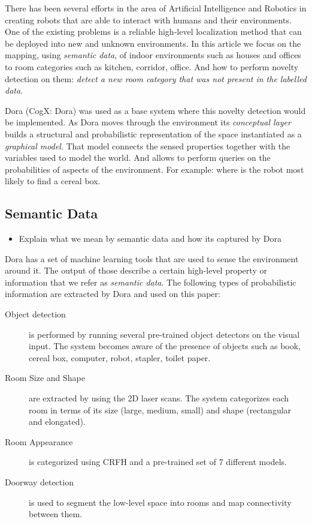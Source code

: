 \documentclass[runningheads,a4paper]{llncs}
\begin{document}
There has been several efforts in the area of Artificial Intelligence and Robotics in creating robots
that are able to interact with humans and their environments.
One of the existing problems is a reliable high-level localization method that can be deployed into new
and unknown environments.
In this article we focus on the mapping, using \emph{semantic data}, of indoor environments such as houses and offices to room categories
such as kitchen, corridor, office.
And how to perform novelty detection on them: \emph{detect a new room category that was not present in the labelled data}.

Dora\cite{dora} (CogX: Dora) was used as a base system where this novelty detection would be implemented.
As Dora moves through the environment its \emph{conceptual layer} builds a structural and probabilistic representation of the space
instantiated as a \emph{graphical model}.
That model connects the sensed properties together with the variables used to model the world.
And allows to perform queries on the probabilities of aspects of the environment.
For example: where is the robot most likely to find a cereal box\cite{exploiting}.

\subsection{Semantic Data}
\begin{itemize}
\item Explain what we mean by semantic data and how its captured by Dora
\end{itemize}

Dora has a set of machine learning tools that are used to sense the environment around it.
The output of those describe a certain high-level property or information that we refer as \emph{semantic data}.
The following types of probabilistic information are extracted by Dora and used on this paper:
\begin{description}
\item[Object detection] is performed by running several pre-trained object detectors on the visual input. The system becomes
aware of the presence of objects such as book, cereal box, computer, robot, stapler, toilet paper.

\item[Room Size and Shape] are extracted by using the 2D laser scans. The system categorizes each room in terms of its size (large, medium, small) and shape (rectangular and elongated).

\item[Room Appearance] is categorized using CRFH and a pre-trained set of 7 different models.

\item[Doorway detection] is used to segment the low-level space into rooms and map connectivity between them.
\end{description}
\end{document}
